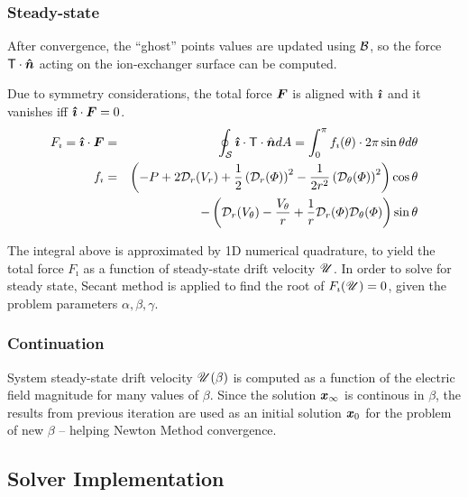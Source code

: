 \subsubsection{Steady-state}
After convergence, the ``ghost'' points values are updated using $\mathcal{B}$,
so the force $\mathsf{T} \cdot \boldsymbol{\hat{n}}$ acting on the ion-exchanger surface
can be computed.

Due to symmetry considerations, the total force $\boldsymbol{F}$ is 
aligned with $\boldsymbol{\hat{\imath}}$ and it vanishes iff $\boldsymbol{\hat{\imath}} \cdot \boldsymbol{F} = 0$.
\begin{eqnarray}
F_\imath = \boldsymbol{\hat{\imath}} \cdot \boldsymbol{F} &=& \oint_\mathcal{S} \boldsymbol{\hat{\imath}} \cdot \mathsf{T} \cdot \hat{\boldsymbol{n}}  dA = 
\int_0^\pi f_\imath(\theta) \cdot 2\pi \sin\theta d\theta 
\\ \nonumber 
f_\imath &=& \left(-P + 2\mathcal{D}_r(V_r) + 
\frac{1}{2}\left(\mathcal{D}_r(\varPhi)\right)^2 - \frac{1}{2r^2}\left(\mathcal{D}_\theta(\varPhi)\right)^2\right)\cos\theta 
\\ \nonumber 
&& -\left(\mathcal{D}_r(V_\theta) - \frac{V_\theta}{r}
+ \frac{1}{r}\mathcal{D}_r(\varPhi) \mathcal{D}_{\theta}(\varPhi)\right)\sin\theta
\end{eqnarray}

The integral above is approximated by 1D numerical quadrature, to yield 
the total force $F_\imath$ as a function of steady-state drift velocity $\mathscr{U}$.
In order to solve for steady state, Secant method is applied to find
the root of $F_\imath(\mathscr{U}) = 0$, given the problem parameters $\alpha, \beta, \gamma$. 

\subsubsection{Continuation}

System steady-state drift velocity $\mathscr{U}(\beta)$ is computed as a function 
of the electric field magnitude for many values of $\beta$.
Since the solution $\boldsymbol{x}_\infty$ is continous in $\beta$, the results from previous 
iteration are used as an initial solution $\boldsymbol{x}_0$ for the problem of new $\beta$ 
-- helping Newton Method convergence.


\subsection{Solver Implementation}
